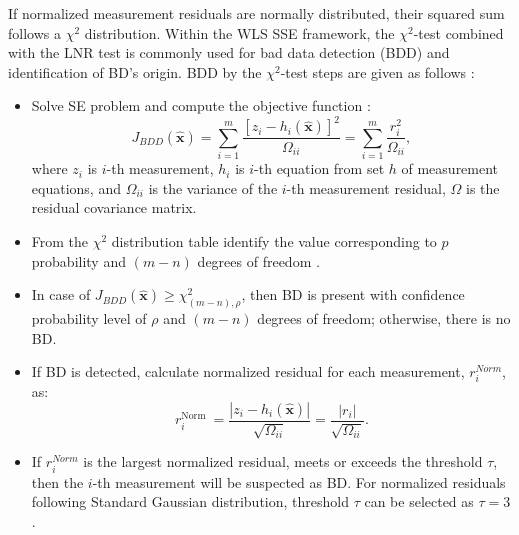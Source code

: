 If normalized measurement residuals are normally distributed, their squared sum follows a $\chi^2$ distribution. Within the WLS SSE framework, the $\chi^2$-test combined with the LNR test is commonly used for bad data detection (BDD) and identification of BD’s origin. BDD by the $\chi^2$-test steps are given as follows \autocite{gomez2017electric}: 
\begin{itemize}
    \item Solve SE problem and compute the objective function \autocite{7232283}:
        \begin{equation}
            J_{B D D}(\hat{\boldsymbol{x}})=\sum_{i=1}^{m} \frac{\left[z_{i}-h_{i}(\hat{\boldsymbol{x}})\right]^{2}}{\Omega_{i i}}=\sum_{i=1}^{m} \frac{r_{i}^{2}}{\Omega_{i i}},
        \end{equation}
        where $z_i$ is $i$-th measurement, $h_i$ is $i$-th equation from set $h$ of measurement  equations, and $\Omega_{ii}$ is the variance of  the $i$-th measurement residual, $\Omega$ is the residual covariance matrix.
        
    \item From the $\chi^2$ distribution table identify the value corresponding to $p$ probability and \((m-n)\) degrees of freedom \autocite{abur2004power}.

    \item In case of \(J_{B D D}(\hat{\boldsymbol{x}}) \geq \chi^2_{(m-n),\rho}\), then BD is present with confidence probability level of $\rho$ and \((m-n)\) degrees of freedom; otherwise, there is no BD.

    \item If BD is detected, calculate normalized residual for each measurement, $r^{Norm}_i$, as:
        \begin{equation}
        r_{i}^{\text {Norm }}=\frac{\left|z_{i}-h_{i}(\hat{\boldsymbol{x}})\right|}{\sqrt{\Omega_{i i}}}=\frac{\left|r_{i}\right|}{\sqrt{\Omega_{i i}}}.
        \end{equation}

    \item If $r^{Norm}_i$ is the largest normalized residual, meets or exceeds the threshold $\tau$, then the $i$-th measurement will be suspected as BD. For normalized residuals following Standard Gaussian distribution, threshold $\tau$ can be selected as \(\tau = 3\).

\end{itemize}

